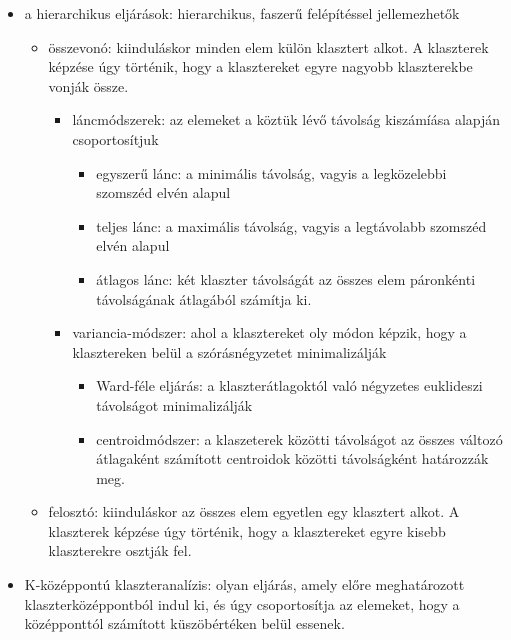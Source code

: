 \documentclass[
  letterpaper,
]{krantz}
\providecommand{\tightlist}{%
  \setlength{\itemsep}{0pt}\setlength{\parskip}{0pt}}\usepackage{longtable,booktabs,array}
\begin{document}
\begin{itemize}
\tightlist
\item
  a hierarchikus eljárások: hierarchikus, faszerű felépítéssel
  jellemezhetők

  \begin{itemize}
  \tightlist
  \item
    összevonó: kiinduláskor minden elem külön klasztert alkot. A
    klaszterek képzése úgy történik, hogy a klasztereket egyre nagyobb
    klaszterekbe vonják össze.

    \begin{itemize}
    \tightlist
    \item
      láncmódszerek: az elemeket a köztük lévő távolság kiszámíása
      alapján csoportosítjuk

      \begin{itemize}
      \tightlist
      \item
        egyszerű lánc: a minimális távolság, vagyis a legközelebbi
        szomszéd elvén alapul
      \item
        teljes lánc: a maximális távolság, vagyis a legtávolabb szomszéd
        elvén alapul
      \item
        átlagos lánc: két klaszter távolságát az összes elem páronkénti
        távolságának átlagából számítja ki.
      \end{itemize}
    \item
      variancia-módszer: ahol a klasztereket oly módon képzik, hogy a
      klasztereken belül a szórásnégyzetet minimalizálják

      \begin{itemize}
      \tightlist
      \item
        Ward-féle eljárás: a klaszterátlagoktól való négyzetes
        euklideszi távolságot minimalizálják
      \item
        centroidmódszer: a klaszeterek közötti távolságot az összes
        változó átlagaként számított centroidok közötti távolságként
        határozzák meg.
      \end{itemize}
    \end{itemize}
  \item
    felosztó: kiinduláskor az összes elem egyetlen egy klasztert alkot.
    A klaszterek képzése úgy történik, hogy a klasztereket egyre kisebb
    klaszterekre osztják fel.
  \end{itemize}
\item
  K-középpontú klaszteranalízis: olyan eljárás, amely előre
  meghatározott klaszterközéppontból indul ki, és úgy csoportosítja az
  elemeket, hogy a középponttól számított küszöbértéken belül essenek.


\end{itemize}
\end{document}
